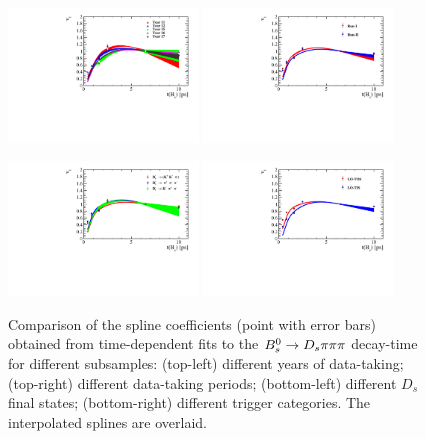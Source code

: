 \begin{figure}[h]
\centering
\includegraphics[height=!,width=0.45\textwidth]{figs/Acceptance/timeAcc_comparison_by_year_t1_adaptive_N4.pdf}
\includegraphics[height=!,width=0.45\textwidth]{figs/Acceptance/timeAcc_comparison_by_run_adaptive_N4.pdf}

\includegraphics[height=!,width=0.45\textwidth]{figs/Acceptance/timeAcc_comparison_by_DsFinalState_mod_adaptive_N4.pdf}
\includegraphics[height=!,width=0.45\textwidth]{figs/Acceptance/timeAcc_comparison_by_trigger_adaptive_N4.pdf}
\caption{Comparison of the spline coefficients (point with error bars) obtained from time-dependent fits to the ${{B}^0_{s}}\rightarrow{\ensuremath{{D}_{s}}}{\ensuremath{\pi}}{\ensuremath{\pi}}{\ensuremath{\pi}}$ decay-time for different subsamples:
(top-left) different years of data-taking; (top-right) different data-taking periods;
(bottom-left) different $D_s$ final states; (bottom-right) different trigger categories. 
The interpolated splines are overlaid.}
\label{fig:AccComp}
\end{figure}


